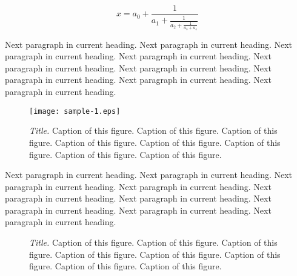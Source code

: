 \begin{equation}
x = a_0 + \frac{1}{\displaystyle a_1
+ \frac{1}{\displaystyle a_2
+ \frac{1}{\displaystyle a_3 + a_4}}}
\label{eq:fractions}
\end{equation}

%
%
%

Next paragraph in current heading. Next paragraph in current heading.
Next paragraph in current heading. Next paragraph in current heading.
Next paragraph in current heading. Next paragraph in current heading.
Next paragraph in current heading. Next paragraph in current heading.
Next paragraph in current heading.

%
%

\begin{figure}[h!]
\centering
\texttt{[image: sample-1.eps]}
\caption[Title]{\textit{Title.} Caption of this figure. Caption of this figure. Caption of this figure.
Caption of this figure. Caption of this figure. Caption of this figure. Caption of this figure. Caption of this figure.}
\label{fig:smiley}
\end{figure}

%
%

Next paragraph in current heading. Next paragraph in current heading.
Next paragraph in current heading. Next paragraph in current heading.
Next paragraph in current heading. Next paragraph in current heading.
Next paragraph in current heading. Next paragraph in current heading.
Next paragraph in current heading.

%

\begin{figure}[h!]
\centering
{}
\hspace{10mm}
\caption[Title]{\textit{Title.} Caption of this figure. Caption of this figure. Caption of this figure.
Caption of this figure. Caption of this figure. Caption of this figure. Caption of this figure. Caption of this figure.}
\label{fig:subfigures}
\end{figure}

